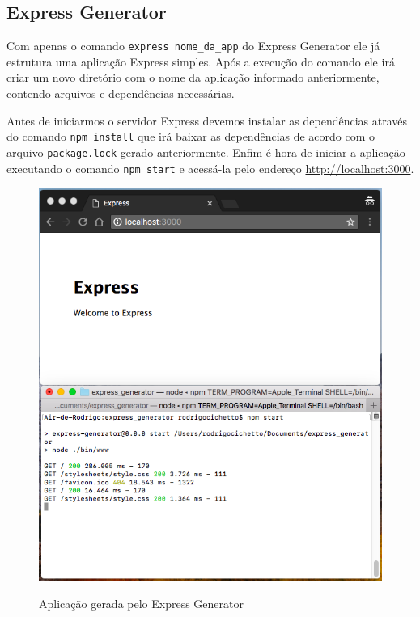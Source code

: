 \documentclass[
	12pt,				%
	openright,			%
	twoside,			%
	a4paper,			%
	english,			%
	brazil				%
	]{abntex2}
\begin{document}
\subsection{Express Generator}

Com apenas o comando \verb|express nome_da_app| do Express Generator ele já estrutura uma aplicação Express simples. Após a execução do comando ele irá criar um novo diretório com o nome da aplicação informado anteriormente, contendo arquivos e dependências necessárias. 

Antes de iniciarmos o servidor Express devemos instalar as dependências através do comando \verb|npm install| que irá baixar as dependências de acordo com o arquivo \verb|package.lock| gerado anteriormente. Enfim é hora de iniciar a aplicação executando o comando \verb|npm start| e acessá-la pelo endereço \href{http://localhost:3000}{http://localhost:3000}.

\begin{figure}[h]
	\centering

	\caption{Aplicação gerada pelo Express Generator} \label{fig:ExpressGeneratorApp}
    \includegraphics[scale=0.5]{express-generator-app} \\

\end{figure}
\end{document}

